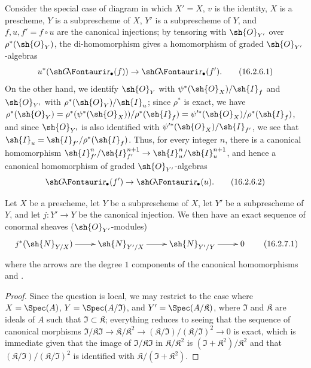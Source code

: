 \begin{env}[16.2.6]
\label{IV.16.2.6}
Consider the special case of diagram  in which $X'=X$, $v$ is the identity, $X$ is a prescheme, $Y$ is a subprescheme of $X$, $Y'$ is a subprescheme of $Y$, and $f,u,f'=f\circ u$ are the canonical injections;
by tensoring with $\sh{O}_{Y'}$ over $\rho^*(\sh{O}_Y)$, the di-homomorphism  gives a homomorphism of graded $\sh{O}_{Y'}$-algebras
\[
  \label{IV.16.2.6.1}
  u^*(\shGr_\bullet(f)) \to \shGr_\bullet(f').
  \tag{16.2.6.1}
\]
On the other hand, we identify $\sh{O}_Y$ with $\psi^*(\sh{O}_X)/\sh{I}_f$ and $\sh{O}_{Y'}$ with $\rho^*(\sh{O}_Y)/\sh{I}_u$;
since $\rho^*$ is exact, we have $\rho^*(\sh{O}_Y)=\rho^*(\psi^*(\sh{O}_X))/\rho^*(\sh{I}_f)=\psi'^*(\sh{O}_X)/\rho^*(\sh{I}_f)$, and since $\sh{O}_{Y'}$ is also identified with $\psi'^*(\sh{O}_X)/\sh{I}_{f'}$, we see that $\sh{I}_u=\sh{I}_{f'}/\rho^*(\sh{I}_f)$.
Thus, for every integer $n$, there is a canonical homomorphism $\sh{I}_{f'}^n/\sh{I}_{f'}^{n+1}\to \sh{I}_{u}^n/\sh{I}_{u}^{n+1}$, and hence a canonical homomorphism of graded $\sh{O}_{Y'}$-algebras
\[
  \label{IV.16.2.6.2}
  \shGr_\bullet(f') \to \shGr_\bullet(u).
  \tag{16.2.6.2}
\]
\end{env}

\begin{proposition}[16.2.7]
\label{IV.16.2.7}
Let $X$ be a prescheme, let $Y$ be a subprescheme of $X$, let $Y'$ be a subprescheme of $Y$, and let $j:Y'\to Y$ be the canonical injection.
We then have an exact sequence of conormal sheaves ($\sh{O}_{Y'}$-modules)
\[
  \label{IV.16.2.7.1}
  \xymatrix{
    j^*(\sh{N}_{Y/X}) \ar[r] & \sh{N}_{Y'/X} \ar[r] & \sh{N}_{Y'/Y} \ar[r] & 0
  }
  \tag{16.2.7.1}
\]
where the arrows are the degree $1$ components of the canonical homomorphisms  and .
\end{proposition}

\begin{proof}
Since the question is local, we may restrict to the case where $X=\Spec(A)$, $Y=\Spec(A/\mathfrak{I})$, and $Y'=\Spec(A/\mathfrak{K})$, where $\mathfrak{I}$ and $\mathfrak{K}$ are ideals of $A$ such that $\mathfrak{I}\subset\mathfrak{K}$;
everything reduces to seeing 
that the sequence of canonical morphisms $\mathfrak{I}/\mathfrak{K}\mathfrak{I} \to \mathfrak{K}/\mathfrak{K}^2 \to (\mathfrak{K}/\mathfrak{I})/(\mathfrak{K}/\mathfrak{I})^2 \to 0$ is exact, which is immediate given that the image of $\mathfrak{I}/\mathfrak{K}\mathfrak{I}$ in $\mathfrak{K}/\mathfrak{K}^2$ is $(\mathfrak{I} + \mathfrak{K}^2)/\mathfrak{K}^2$ and that $(\mathfrak{K}/\mathfrak{I})/(\mathfrak{K}/\mathfrak{I})^2$ is identified with $\mathfrak{K}/(\mathfrak{I} + \mathfrak{K}^2)$.
\end{proof}

